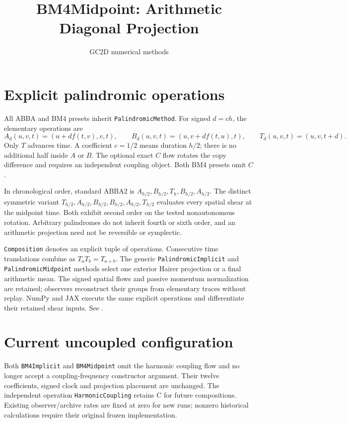\documentclass[11pt,a4paper]{article}
\title{BM4Midpoint: Arithmetic Diagonal Projection}
\author{GC2D numerical methods}
\date{}
\begin{document}
\maketitle

\section*{Explicit palindromic operations}
All ABBA and BM4 presets inherit \texttt{PalindromicMethod}. For signed
$d=c h$, the elementary operations are
\[
 A_d(u,v,t)=(u+d f(t,v),v,t),\qquad
 B_d(u,v,t)=(u,v+d f(t,u),t),\qquad
 T_d(u,v,t)=(u,v,t+d).
\]
Only $T$ advances time. A coefficient $c=1/2$ means duration $h/2$;
there is no additional half inside $A$ or $B$. The optional exact $C$ flow
rotates the copy difference and requires an independent coupling object.
Both BM4 presets omit $C$.

In chronological order, standard ABBA2 is
$A_{h/2},B_{h/2},T_h,B_{h/2},A_{h/2}$.
The distinct symmetric variant
$T_{h/2},A_{h/2},B_{h/2},B_{h/2},A_{h/2},T_{h/2}$
evaluates every spatial shear at the midpoint time. Both exhibit second
order on the tested nonautonomous rotation. Arbitrary palindromes do not
inherit fourth or sixth order, and an arithmetic projection need not be
reversible or symplectic.

\texttt{Composition} denotes an explicit tuple of operations.
Consecutive time translations combine as $T_a T_b=T_{a+b}$.
The generic \texttt{PalindromicImplicit} and \texttt{PalindromicMidpoint}
methods select one exterior Hairer projection or a final arithmetic mean.
The signed spatial flows and passive momentum normalization are retained;
observers reconstruct their groups from elementary traces without replay. NumPy and JAX execute the same
explicit operations and differentiate their retained shear inputs.
See .

\section*{Current uncoupled configuration}
Both \texttt{BM4Implicit} and \texttt{BM4Midpoint} omit the harmonic
coupling flow and no longer accept a coupling-frequency constructor argument.
Their twelve coefficients, signed clock and projection placement are unchanged.
The independent operation \texttt{HarmonicCoupling} retains C for future
compositions. Existing observer/archive rates are fixed at zero for new runs;
nonzero historical calculations require their original frozen implementation.
\end{document}
